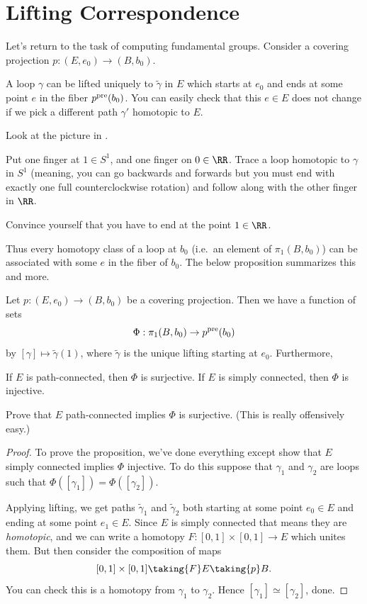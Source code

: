 \section{Lifting Correspondence}
Let's return to the task of computing fundamental groups.
Consider a covering projection $p : (E, e_0) \to (B, b_0)$.

A loop $\gamma$ can be lifted uniquely to $\tilde\gamma$ in $E$
which starts at $e_0$ and ends at some point $e$ in the fiber $p^{\text{pre}}(b_0)$.
You can easily check that this $e \in E$ does not change if we
pick a different path $\gamma'$ homotopic to $E$.
\begin{ques}
	Look at the picture in .

	Put one finger at $1 \in S^1$, and one finger on $0 \in \RR$.
	Trace a loop homotopic to $\gamma$ in $S^1$ (meaning, you can
	go backwards and forwards but you must end with exactly one full
	counterclockwise rotation)
	and follow along with the other finger in $\RR$.

	Convince yourself that you have to end at the point $1 \in \RR$.
\end{ques}

Thus every homotopy class of a loop at $b_0$ (i.e.\ an element of $\pi_1(B, b_0)$) can be associated with some $e$ in the fiber of $b_0$.
The below proposition summarizes this and more.
\begin{proposition}
	Let $p : (E,e_0) \to (B,b_0)$ be a covering projection.
	Then we have a function of sets
	\[ \Phi : \pi_1(B, b_0) \to p^{\text{pre}}(b_0) \]
	by $[\gamma] \mapsto \tilde\gamma(1)$, where $\tilde\gamma$
	is the unique lifting starting at $e_0$.
	Furthermore,
	\begin{itemize}
		\ii If $E$ is path-connected, then $\Phi$ is surjective.
		\ii If $E$ is simply connected, then $\Phi$ is injective.
	\end{itemize}
\end{proposition}
\begin{ques}
	Prove that $E$ path-connected implies $\Phi$ is surjective.
	(This is really offensively easy.)
\end{ques}
\begin{proof}
	To prove the proposition, we've done everything except show
	that $E$ simply connected implies $\Phi$ injective.
	To do this suppose that $\gamma_1$ and $\gamma_2$ are loops
	such that $\Phi([\gamma_1]) = \Phi([\gamma_2])$.

	Applying lifting, we get paths $\tilde\gamma_1$ and $\tilde\gamma_2$
	both starting at some point $e_0 \in E$ and ending at some point $e_1 \in E$.
	Since $E$ is simply connected that means they are \emph{homotopic},
	and we can write a homotopy $F : [0,1] \times [0,1] \to E$
	which unites them.
	But then consider the composition of maps
	\[ [0,1] \times [0,1] \taking{F} E \taking{p} B. \]
	You can check this is a homotopy from $\gamma_1$ to $\gamma_2$.
	Hence $[\gamma_1] \simeq [\gamma_2]$, done.
\end{proof}

